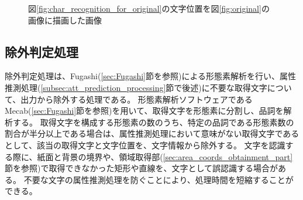 \begin{figure}[t]
    \begin{center}
        \caption{図\ref{fig:char_recognition_for_original}の文字位置を図\ref{fig:original}の画像に描画した画像}
        \label{fig:bbox_recognition_for_original}
    \end{center}
\end{figure}

\subsection{除外判定処理}\label{subsec:exclusion_judgement_processing}
除外判定処理は、Fugashi(\ref{sec:Fugashi}節を参照)による形態素解析を行い、属性推測処理(\ref{subsec:att_prediction_processing}節で後述)に不要な取得文字について、出力から除外する処理である。
形態素解析ソフトウェアであるMecab(\ref{sec:Fugashi}節を参照)を用いて、取得文字を形態素に分割し、品詞を解析する。
取得文字を構成する形態素の数のうち、特定の品詞である形態素数の割合が半分以上である場合は、属性推測処理において意味がない取得文字であるとして、該当の取得文字と文字位置を、文字情報から除外する。
文字を認識する際に、紙面と背景の境界や、領域取得部(\ref{sec:area_coords_obtainment_part}節を参照)で取得できなかった矩形や直線を、文字として誤認識する場合がある。
不要な文字の属性推測処理を防ぐことにより、処理時間を短縮することができる。

